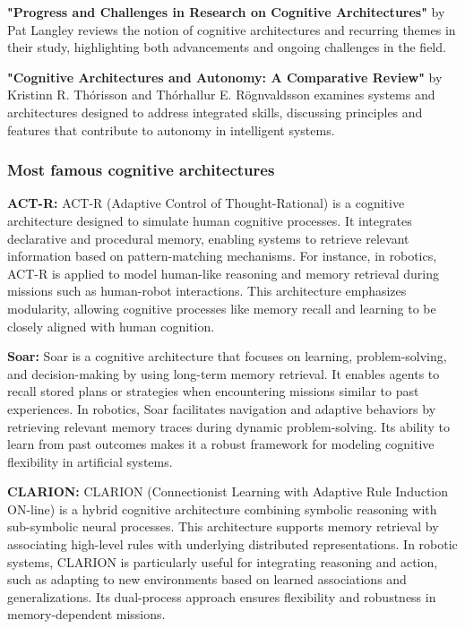             \textbf{"Progress and Challenges in Research on Cognitive Architectures"} by Pat Langley reviews the notion of cognitive architectures and recurring themes in their study, highlighting both advancements and ongoing challenges in the field. 

            \textbf{"Cognitive Architectures and Autonomy: A Comparative Review"} by Kristinn R. Thórisson and Thórhallur E. Rögnvaldsson examines systems and architectures designed to address integrated skills, discussing principles and features that contribute to autonomy in intelligent systems. 



        \subsubsection{Most famous cognitive architectures}
            \textbf{ACT-R:} ACT-R (Adaptive Control of Thought-Rational) is a cognitive architecture designed to simulate human cognitive processes. It integrates declarative and procedural memory, enabling systems to retrieve relevant information based on pattern-matching mechanisms. For instance, in robotics, ACT-R is applied to model human-like reasoning and memory retrieval during missions such as human-robot interactions. This architecture emphasizes modularity, allowing cognitive processes like memory recall and learning to be closely aligned with human cognition.

            \textbf{Soar:} Soar is a cognitive architecture that focuses on learning, problem-solving, and decision-making by using long-term memory retrieval. It enables agents to recall stored plans or strategies when encountering missions similar to past experiences. In robotics, Soar facilitates navigation and adaptive behaviors by retrieving relevant memory traces during dynamic problem-solving. Its ability to learn from past outcomes makes it a robust framework for modeling cognitive flexibility in artificial systems.

            \textbf{CLARION:} CLARION (Connectionist Learning with Adaptive Rule Induction ON-line) is a hybrid cognitive architecture combining symbolic reasoning with sub-symbolic neural processes. This architecture supports memory retrieval by associating high-level rules with underlying distributed representations. In robotic systems, CLARION is particularly useful for integrating reasoning and action, such as adapting to new environments based on learned associations and generalizations. Its dual-process approach ensures flexibility and robustness in memory-dependent missions.

